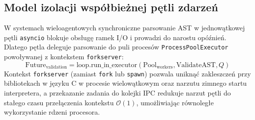\subsection{Model izolacji współbieżnej pętli zdarzeń}
\label{subsec:projekt_starvation_model}

W systemach wieloagentowych synchroniczne parsowanie AST w jednowątkowej pętli \texttt{asyncio} blokuje obsługę ramek I/O i prowadzi do narostu opóźnień. Dlatego pętla deleguje parsowanie do puli procesów \texttt{ProcessPoolExecutor} powoływanej z kontekstem \texttt{forkserver}:
\begin{equation}
\text{Future}_{\text{validation}} = \text{loop.run\_in\_executor}(\text{Pool}_{\text{workers}}, \text{ValidateAST}, Q)
\label{eq:executor_delegation}
\end{equation}
Kontekst \texttt{forkserver} (zamiast \texttt{fork} lub \texttt{spawn}) pozwala uniknąć zakleszczeń przy bibliotekach w języku C w procesie wielowątkowym oraz narzutu zimnego startu interpretera, a przekazanie zadania do kolejki IPC redukuje narzut pętli do stałego czasu przełączenia kontekstu $\mathcal{O}(1)$, umożliwiając równoległe wykorzystanie rdzeni procesora.
